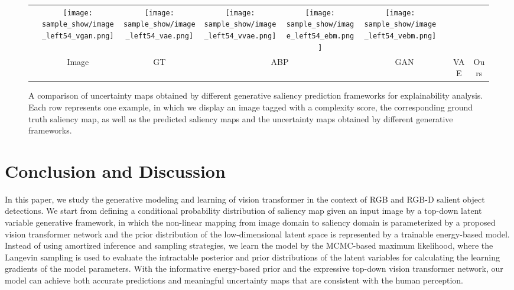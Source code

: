 \documentclass{article}
\begin{document}
\begin{figure*}[h!]
\begin{center}
\begin{tabular}{c@{ }c@{ }c@{ }c@{ }c@{ }c@{ }c@{ }c@{ }c@{ }c@{ }c@{ }}
  & 
  {\texttt{[image: sample\_show/image\_left54\_vgan.png]}}& 
  {\texttt{[image: sample\_show/image\_left54\_vae.png]}}
  & 
  {\texttt{[image: sample\_show/image\_left54\_vvae.png]}}
  & 
  {\texttt{[image: sample\_show/image\_left54\_ebm.png]}}
  & 
  {\texttt{[image: sample\_show/image\_left54\_vebm.png]}}\\
&\footnotesize{Image}&\footnotesize{GT}&\multicolumn{2}{c}{\footnotesize{ABP}}&\multicolumn{2}{c}{\footnotesize{GAN}}&\multicolumn{2}{c}{\footnotesize{VAE}}&\multicolumn{2}{c}{\footnotesize{Ours}}\\
   \end{tabular}
   \end{center}
\caption{A comparison of uncertainty maps obtained by different generative saliency prediction frameworks for explainability analysis. Each row represents one example, in which we display an image tagged with a complexity score, the corresponding ground truth saliency map, as well as the predicted saliency maps and the uncertainty maps obtained by different generative frameworks.  
   }
\label{fig:generative_model_uncertainty_maps}
\end{figure*}








\section{Conclusion and Discussion}



In this paper, we study the generative modeling and learning of vision transformer in the context of RGB and RGB-D salient object detections. We start from defining a conditional probability distribution of saliency map given an input image by a top-down latent variable generative framework, in which the non-linear mapping from image domain to saliency domain is parameterized by a proposed vision transformer network and the prior distribution of the low-dimensional latent space is represented by a trainable energy-based model. Instead of using amortized inference and sampling strategies, we learn the model by the MCMC-based maximum likelihood, where the Langevin sampling is used to evaluate the intractable posterior and prior distributions of the latent variables for calculating the learning gradients of the model parameters. With the informative energy-based prior and the expressive top-down vision transformer network, our model can achieve both accurate predictions and meaningful uncertainty maps that are consistent with the human perception. 
\end{document}
